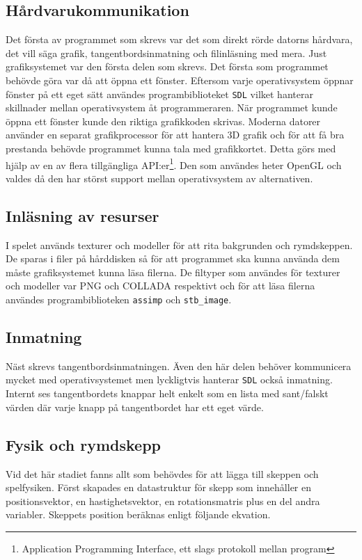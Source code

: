 \documentclass[12pt, a4paper]{article}
\newcommand{\code}{\texttt}
\begin{document}
	\subsection{Hårdvarukommunikation}
	Det första av programmet som skrevs var det som direkt rörde datorns hårdvara, det vill säga grafik, tangentbordsinmatning och filinläsning med mera. Just grafiksystemet var den första delen som skrevs. Det första som programmet behövde göra var då att öppna ett fönster. Eftersom varje operativsystem öppnar fönster på ett eget sätt användes programbiblioteket \code{SDL} vilket hanterar skillnader mellan operativsystem åt programmeraren. När programmet kunde öppna ett fönster kunde den riktiga grafikkoden skrivas. Moderna datorer använder en separat grafikprocessor för att hantera 3D grafik och för att få bra prestanda behövde programmet kunna tala med grafikkortet. Detta görs med hjälp av en av flera tillgängliga API:er\footnote{Application Programming Interface, ett slags protokoll mellan program}. Den som användes heter OpenGL och valdes då den har störst support mellan operativsystem av alternativen. 
	
	\subsection{Inläsning av resurser}
	I spelet används texturer och modeller för att rita bakgrunden och rymdskeppen. De sparas i filer på hårddisken så för att programmet ska kunna använda dem måste grafiksystemet kunna läsa filerna. De filtyper som användes för texturer och modeller var PNG och COLLADA respektivt och för att läsa filerna användes programbiblioteken \code{assimp} och \code{stb\_image}. 
	
	\subsection{Inmatning}
	Näst skrevs tangentbordsinmatningen. Även den här delen behöver kommunicera mycket med operativsystemet men lyckligtvis hanterar \code{SDL} också inmatning. Internt ses tangentbordets knappar helt enkelt som en lista med sant/falskt värden där varje knapp på tangentbordet har ett eget värde. 
	
	\subsection{Fysik och rymdskepp}
	Vid det här stadiet fanns allt som behövdes för att lägga till skeppen och spelfysiken. Först skapades en datastruktur för skepp som innehåller en positionsvektor, en hastighetsvektor, en rotationsmatris plus en del andra variabler. Skeppets position beräknas enligt följande ekvation. 
	
\end{document}

